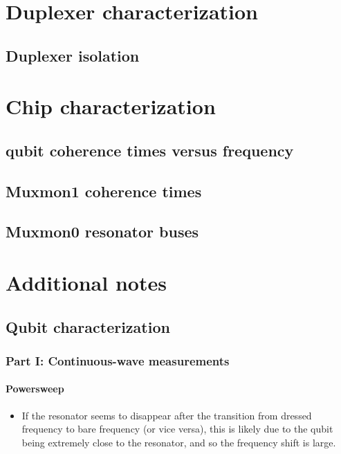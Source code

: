 

\chapter{Duplexer characterization}
  \section{Duplexer isolation}
  \label{ch:Duplexer isolation}

\chapter{Chip characterization}
  \section{qubit coherence times versus frequency}
  \section{Muxmon1 coherence times}
    \label{sec:Muxmon1 coherence times}
  \section{Muxmon0 resonator buses}
    \label{sec:Resonator buses}

\chapter{Additional notes}
\section{Qubit characterization}
  \subsection{Part I: Continuous-wave measurements}
    \subsubsection{Powersweep}
      \begin{itemize}
        \item If the resonator seems to disappear after the transition from dressed frequency to bare frequency (or vice versa), this is likely due to the qubit being extremely close to the resonator, and so the frequency shift is large.
      \end{itemize}
